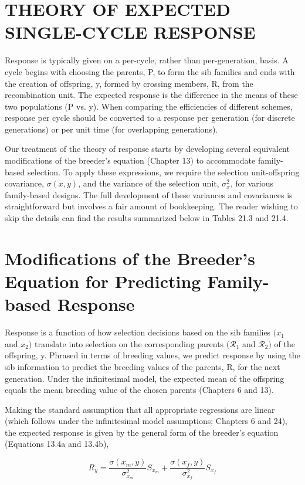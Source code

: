 \documentclass{article}
\begin{document}
\section{THEORY OF EXPECTED SINGLE-CYCLE RESPONSE}
Response is typically given on a per-cycle, rather than per-generation, basis. A cycle begins with choosing the parents, P, to form the sib families and ends with the creation of offspring, y, formed by crossing members, R, from the recombination unit. The expected response is the difference in the means of these two populations (P vs. y). When comparing the efficiencies of different schemes, response per cycle should be converted to a response per generation (for discrete generations) or per unit time (for overlapping generations).

Our treatment of the theory of response starts by developing several equivalent modifications of the breeder's equation (Chapter 13) to accommodate family-based selection. To apply these expressions, we require the selection unit-offspring covariance,  $ \sigma(x, y) $, and the variance of the selection unit,  $ \sigma_x^2 $, for various family-based designs. The full development of these variances and covariances is straightforward but involves a fair amount of bookkeeping. The reader wishing to skip the details can find the results summarized below in Tables 21.3 and 21.4.

\section{Modifications of the Breeder's Equation for Predicting Family-based Response}
Response is a function of how selection decisions based on the sib families  $ (x_{1} $ and  $ x_{2}) $ translate into selection on the corresponding parents  $ (\mathcal{R}_{1} $ and  $ \mathcal{R}_{2}) $ of the offspring, y. Phrased in terms of breeding values, we predict response by using the sib information to predict the breeding values of the parents, R, for the next generation. Under the infinitesimal model, the expected mean of the offspring equals the mean breeding value of the chosen parents (Chapters 6 and 13).

Making the standard assumption that all appropriate regressions are linear (which follows under the infinitesimal model assumptions; Chapters 6 and 24), the expected response is given by the general form of the breeder's equation (Equations 13.4a and 13.4b),

\begin{equation}
R_{y}=\frac{\sigma(x_{m},y)}{\sigma_{x_{m}}^{2}}S_{x_{m}}+\frac{\sigma(x_{f},y)}{\sigma_{x_{f}}^{2}}S_{x_{f}}
\tag{21.1a}
\label{eq:21_1a}
\end{equation}
\end{document}
